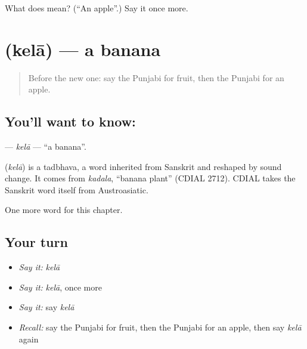 \begin{tcolorbox}[breakable,colback=teal!4,colframe=teal!35!black,title={Before you move on}]
What does  mean? (\textquotedblleft{}An apple\textquotedblright{}.) Say it once more.
\end{tcolorbox}
\section[\texorpdfstring{\pa{ਕੇਲਾ} (kelā)}{ਕੇਲਾ (kelā)}]{ (kelā) — a banana}

\label{lesson:PA-C64-kela}



\begin{quote}
Before the new one: say the Punjabi for fruit, then the Punjabi for an apple.
\end{quote}

\subsection*{You'll want to know: }
\textbf{} — \emph{kelā} — \textquotedblleft{}a banana\textquotedblright{}.

\begin{cousinweb}
\textbf{} (\emph{kelā}) is a tadbhava, a word inherited from Sanskrit and reshaped by sound change. It comes from \emph{kadala}, \textquotedblleft{}banana plant\textquotedblright{} (CDIAL 2712). CDIAL takes the Sanskrit word itself from Austroasiatic.
\end{cousinweb}

\begin{grammarlens}[title={What you've built}]
One more word for this chapter.
\end{grammarlens}

\subsection*{Your turn}
\begin{itemize}
\raggedright
  \item \emph{Say it:} \emph{kelā}
  \item \emph{Say it:} \emph{kelā}, once more
  \item \emph{Say it:} say \emph{kelā}
  \item \emph{Recall:} say the Punjabi for fruit, then the Punjabi for an apple, then say \emph{kelā} again
\end{itemize}

